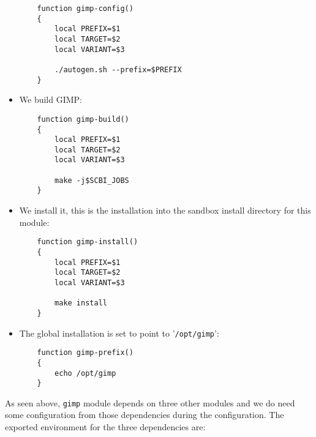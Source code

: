\documentclass[a4paper,12pt,twoside]{article}
\newcommand{\code}[1]{\texttt{#1}}
\newcommand{\file}[1]{'{\texttt{#1}}'}
\begin{document}
\begin{itemize}
	\begin{lstlisting}
	function gimp-config()
	{
		local PREFIX=$1
		local TARGET=$2
		local VARIANT=$3

		./autogen.sh --prefix=$PREFIX
	}
	\end{lstlisting}

	\item We build GIMP:

	\begin{lstlisting}
	function gimp-build()
	{
		local PREFIX=$1
		local TARGET=$2
		local VARIANT=$3

		make -j$SCBI_JOBS
	}
	\end{lstlisting}

	\item We install it, this is the installation into the sandbox install directory for this module:

	\begin{lstlisting}
	function gimp-install()
	{
		local PREFIX=$1
		local TARGET=$2
		local VARIANT=$3

		make install
	}
	\end{lstlisting}

	\item The global installation is set to point to \file{/opt/gimp}:

	\begin{lstlisting}
	function gimp-prefix()
	{
		echo /opt/gimp
	}
	\end{lstlisting}

\end{itemize}

As seen above, \code{gimp} module depends on three other modules and we do need some configuration from those dependencies during the configuration. The exported environment for the three dependencies are:
\end{document}
